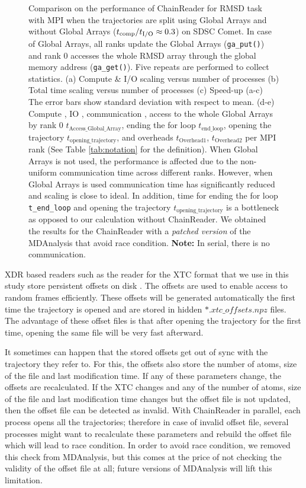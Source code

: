 \begin{figure}[ht!]
\caption{Comparison on the performance of ChainReader for RMSD task with MPI when the trajectories are split using Global Arrays and without Global Arrays (${t}_{\text{comp}}/{t}_{\text{I/O}} \approx 0.3$) on SDSC Comet.
In case of Global Arrays, all ranks update the Global Arrays (\texttt{ga\_put()}) and rank 0 accesses the whole RMSD array through the global memory address (\texttt{ga\_get()}).
Five repeats are performed to collect statistics. (a) Compute \& I/O scaling versus number of processes (b) Total time scaling versus number of processes (c) Speed-up (a-c) The error bars show standard deviation with respect to mean. (d-e) Compute \tcomp, IO \tIO, communication \tcomm, access to the whole Global Arrays by rank 0 \texttt{$t_{\text{Access\_Global\_Array}}$}, ending the for loop \texttt{$t_{\text{end\_loop}}$},
  opening the trajectory \texttt{$t_{\text{opening\_trajectory}}$}, and overheads \texttt{$t_{\text{Overhead1}}$},  \texttt{$t_{\text{Overhead2}}$} per MPI rank (See Table \ref{tab:notation} for the definition). When Global Arrays is not used, the performance is affected due to the non-uniform communication time across different ranks. However, when Global Arrays is used communication time has significantly reduced and scaling is close to ideal. In addition, time for ending the for loop \texttt{t\_end\_loop} and 
opening the trajectory \texttt{$t_{\text{opening\_trajectory}}$} is a bottleneck as opposed to our calculation without ChainReader. We obtained the results for the ChainReader with a \emph{patched version} of the MDAnalysis that avoid race condition. \textbf{Note:} In serial, there is no communication.}
\label{fig:MPIwithIO-split-chain-reader}
\end{figure}

XDR based readers such as the reader for the XTC format that we use in this study store persistent offsets on disk \citep{Gowers:2016aa}. 
The offsets are used to enable access to random frames efficiently. 
These offsets will be generated automatically the first time the trajectory is opened and are stored in hidden $\ast.xtc\_offsets.npz$ files. 
The advantage of these offset files is that after opening the trajectory for the first time, opening the same file will be very fast afterward. 

It sometimes can happen that the stored offsets get out of sync with the trajectory they refer to. 
For this, the offsets also store the number of atoms, size of the file and last modification time. 
If any of these parameters change, the offsets are recalculated. 
If the XTC changes and any of the number of atoms, size of the file and last modification time changes but the offset file is not updated, then the offset file can be detected as invalid.
With ChainReader in parallel, each process opens all the trajectories; therefore in case of invalid offset file, several processes might want to recalculate these parameters and rebuild the offset file which will lead to race condition.
In order to avoid race condition, we removed this check from MDAnalysis, but this comes at the price of not checking the validity of the offset file at all; future versions of MDAnalysis will lift this limitation.
 
